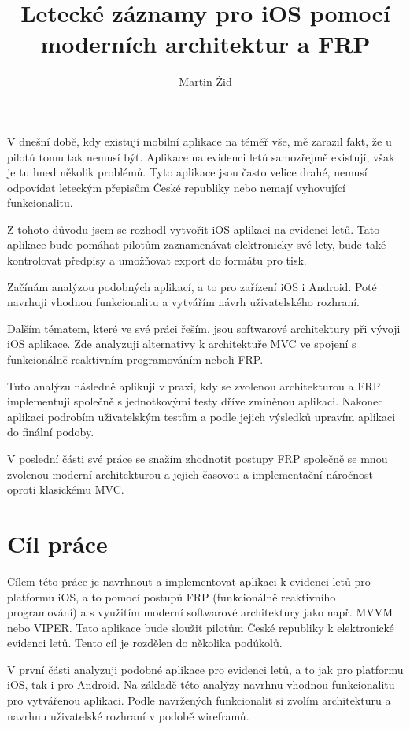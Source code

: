 \documentclass[thesis=M,czech]{FITthesis}[2012/06/26]
\title{Letecké záznamy pro iOS pomocí moderních architektur a FRP}
\author{Martin Žid} %
\begin{document}

\begin{introduction}
V dnešní době, kdy existují mobilní aplikace na téměř vše, mě zarazil fakt, že u pilotů tomu tak nemusí být. Aplikace na evidenci letů samozřejmě existují, však je tu hned několik problémů. Tyto aplikace jsou často velice drahé, nemusí odpovídat leteckým přepisům České republiky nebo nemají vyhovující funkcionalitu.

Z tohoto důvodu jsem se rozhodl vytvořit iOS aplikaci na evidenci letů. Tato aplikace bude pomáhat pilotům zaznamenávat elektronicky své lety, bude také kontrolovat předpisy a umožňovat export do formátu pro tisk.

Začínám analýzou podobných aplikací, a to pro zařízení iOS i Android. Poté navrhuji vhodnou funkcionalitu a vytvářím návrh uživatelského rozhraní.

Dalším tématem, které ve své práci řeším, jsou softwarové architektury při vývoji iOS aplikace. Zde analyzuji alternativy k architektuře MVC ve spojení s funkcionálně reaktivním programováním neboli FRP.

Tuto analýzu následně aplikuji v praxi, kdy se zvolenou architekturou a FRP implementuji společně s jednotkovými testy dříve zmíněnou aplikaci. Nakonec aplikaci podrobím uživatelským testům a podle jejich výsledků
upravím aplikaci do finální podoby.

V poslední části své práce se snažím zhodnotit postupy FRP společně se mnou zvolenou moderní architekturou a jejich časovou a implementační náročnost oproti klasickému MVC.
\end{introduction}

\chapter{Cíl práce}
Cílem této práce je navrhnout a implementovat aplikaci k evidenci letů pro platformu iOS, a to pomocí postupů FRP (funkcionálně reaktivního programování) a s využitím moderní softwarové architektury jako např. MVVM nebo VIPER.  Tato aplikace bude sloužit pilotům České republiky k elektronické evidenci letů. Tento cíl je rozdělen do několika podúkolů.

V první části analyzuji podobné aplikace pro evidenci letů, a to jak pro platformu iOS, tak i pro Android. Na základě této analýzy navrhnu vhodnou funkcionalitu pro vytvářenou aplikaci. Podle navržených funkcionalit si zvolím architekturu  a navrhnu uživatelské rozhraní v podobě wireframů.
\end{document}
